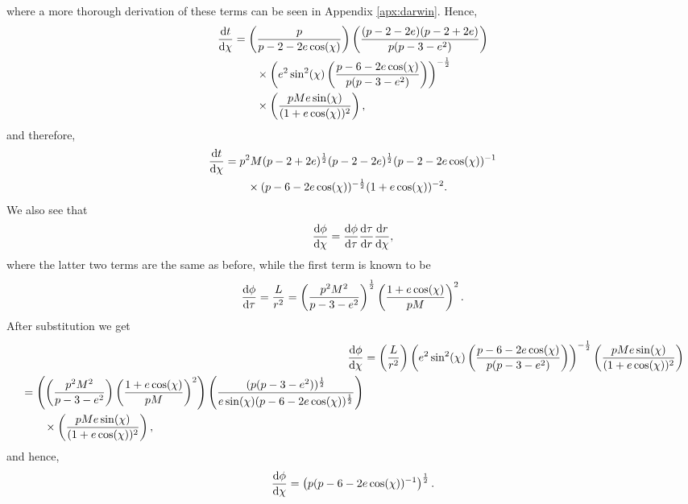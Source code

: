 where a more thorough derivation of these terms can be seen in Appendix \ref{apx:darwin}. Hence,
\begin{align}
\begin{split}
\dv{t}{\chi}&=\left(\frac{p}{p-2-2e\cos(\chi)} \right)\left(\frac{(p-2-2e)(p-2+2e)}{p(p-3-e^2)}\right)\\
&\qquad\times\left(e^2\sin^2(\chi)\left(\frac{p-6-2e\cos(\chi)}{p(p-3-e^2)} \right)\right)^{-\frac{1}{2}}\\
&\qquad\times\left(\frac{pMe\sin(\chi)}{(1+e\cos(\chi))^2} \right),
\end{split}
\end{align}
and therefore,
\begin{equation}\label{eqn:dtdchi}
\begin{split}
\dv{t}{\chi}&=p^2M(p-2+2e)^{\frac{1}{2}}(p-2-2e)^{\frac{1}{2}}(p-2-2e\cos(\chi))^{-1}\\
&\qquad\times(p-6-2e\cos(\chi))^{-\frac{1}{2}}(1+e\cos(\chi))^{-2}.
\end{split}
\end{equation}
We also see that 
\begin{equation}
\dv{\phi}{\chi}=\dv{\phi}{\tau}\dv{\tau}{r}\dv{r}{\chi},
\end{equation}
where the latter two terms are the same as before, while the first term is known to be
\begin{equation}
\dv{\phi}{\tau}=\frac{L}{r^2}=\left(\frac{p^2M^2}{p-3-e^2} \right)^{\frac{1}{2}}\left(\frac{1+e\cos(\chi)}{pM} \right)^2.
\end{equation}
After substitution we get
\begin{align}
    \dv{\phi}{\chi}&=\left(\frac{L}{r^2}\right)\left(e^2\sin^2(\chi)\left(\frac{p-6-2e\cos(\chi)}{p(p-3-e^2)}\right)\right)^{-\frac{1}{2}}\left(\frac{pMe\sin(\chi)}{(1+e\cos(\chi))^2} \right)\\
    \begin{split}
    &=\left(\left(\frac{p^2M^2}{p-3-e^2} \right)\left(\frac{1+e\cos(\chi)}{pM} \right)^2\right)\left(\frac{(p(p-3-e^2))^{\frac{1}{2}}}{e\sin(\chi)(p-6-2e\cos(\chi))^{\frac{1}{2}}} \right)\\
    &\qquad\times\left(\frac{pMe\sin(\chi)}{(1+e\cos(\chi))^2} \right),
    \end{split}
\end{align}
and hence,
\begin{equation}\label{eqn:dphidchi}
	\dv{\phi}{\chi}=\left(p(p-6-2e\cos(\chi))^{-1}\right)^{\frac{1}{2}}.
\end{equation}

